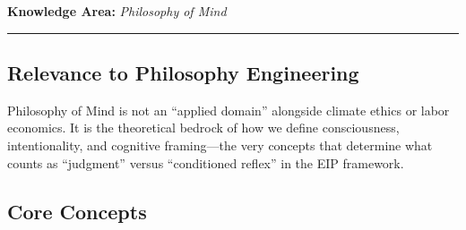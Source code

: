 \documentclass[12pt,letterpaper]{article}
\theoremstyle{definition}
\theoremstyle{plain}
\newcommand{\ka}[1]{\vspace{1em}\noindent\textbf{\large Knowledge Area:} \textit{#1}\vspace{0.5em}\hrule\vspace{0.5em}}
\begin{document}
\ka{Philosophy of Mind}

\subsection{Relevance to Philosophy Engineering}

Philosophy of Mind is not an ``applied domain'' alongside climate ethics or labor economics. It is the theoretical bedrock of how we define consciousness, intentionality, and cognitive framing---the very concepts that determine what counts as ``judgment'' versus ``conditioned reflex'' in the EIP framework.

\subsection{Core Concepts}
\end{document}
